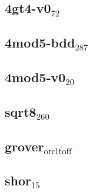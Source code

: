 \documentclass[11pt]{article}
\begin{document}
\subsection{4gt4-v0\(_{\text{72}}\)}
\label{sec:org2e754e1}

\subsection{4mod5-bdd\(_{\text{287}}\)}
\label{sec:org8a2f23a}

\subsection{4mod5-v0\(_{\text{20}}\)}
\label{sec:org8706549}

\subsection{sqrt8\(_{\text{260}}\)}
\label{sec:orgfcc052d}

\subsection{grover\(_{\text{orcl}}\)\(_{\text{toff}}\)}
\label{sec:orgbed49c0}

\subsection{shor\(_{\text{15}}\)}
\label{sec:org3ccde47}
\end{document}
